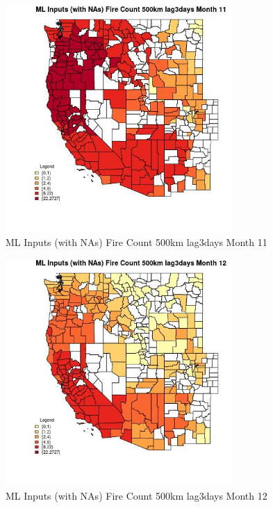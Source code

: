 \clearpage 

\begin{figure} 
\centering  
\includegraphics[width=0.77\textwidth]{Code_Outputs/Report_ML_input_PM25_Step4_part_f_de_duplicated_aveswNAs_CountyFire_Count_500km_lag3daysmedianMonth11.jpg} 
\caption{\label{fig:Report_ML_input_PM25_Step4_part_f_de_duplicated_aveswNAsCountyFire_Count_500km_lag3daysmedianMonth11}ML Inputs (with NAs) Fire Count 500km lag3days Month 11} 
\end{figure} 
 

\begin{figure} 
\centering  
\includegraphics[width=0.77\textwidth]{Code_Outputs/Report_ML_input_PM25_Step4_part_f_de_duplicated_aveswNAs_CountyFire_Count_500km_lag3daysmedianMonth12.jpg} 
\caption{\label{fig:Report_ML_input_PM25_Step4_part_f_de_duplicated_aveswNAsCountyFire_Count_500km_lag3daysmedianMonth12}ML Inputs (with NAs) Fire Count 500km lag3days Month 12} 
\end{figure} 
 

